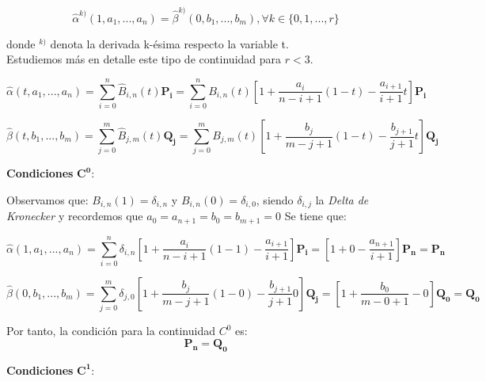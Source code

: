 \documentclass{article}
\begin{document}
\begin{equation}
\hat{\alpha}^{k)}(1,a_1,...,a_n) = \hat{\beta}^{k)}(0,b_1,...,b_m), \forall k \in \{0,1,...,r\}
\end{equation}

donde $^{k)}$ denota la derivada k-ésima respecto la variable t.\\

Estudiemos más en detalle este tipo de continuidad para $r<3$.

\begin{equation*}
\hat{\alpha}(t,a_1,...,a_n) = \sum_{i=0}^{n}\hat{B}_{i,n}(t)\mathbf{P_i} = \sum_{i=0}^n B_{i,n}(t)\left[ 1 + \frac{a_i}{n-i+1}(1-t) - \frac{a_{i+1}}{i+1}t \right] \mathbf{P_i}
\end{equation*}


\begin{equation*}
\hat{\beta}(t,b_1,...,b_m) = \sum_{j=0}^{m}\hat{B}_{j,m}(t)\mathbf{Q_j} = \sum_{j=0}^m B_{j,m}(t)\left[ 1 + \frac{b_j}{m-j+1}(1-t) - \frac{b_{j+1}}{j+1}t \right] \mathbf{Q_j}
\end{equation*}



\textbf{Condiciones} $\mathbf{C^0}$:

Observamos que: $B_{i,n}(1) = \delta_{i,n}$ y $B_{i,n}(0) = \delta_{i,0}$, siendo $\delta_{i,j}$ la \textit{Delta de Kronecker} y recordemos que $a_0=a_{n+1}=b_0=b_{m+1}=0$ Se tiene que:

\begin{equation*}
\hat{\alpha}(1,a_1,...,a_n) = \sum_{i=0}^n \delta_{i,n} \left[ 1 + \frac{a_i}{n-i+1}(1-1) - \frac{a_{i+1}}{i+1}  \right] \mathbf{P_i} = \left[ 1 + 0 - \frac{a_{n+1}}{i+1} \right] \mathbf{P_n} = \mathbf{P_n}
\end{equation*}

\begin{equation*}
\hat{\beta}(0,b_1,...,b_m) = \sum_{j=0}^m \delta_{j,0} \left[ 1 + \frac{b_j}{m-j+1}(1-0) - \frac{b_{j+1}}{j+1}0 \right] \mathbf{Q_j} = \left[ 1 + \frac{b_0}{m-0+1} - 0 \right] \mathbf{Q_0} = \mathbf{Q_0}
\end{equation*}

Por tanto, la condición para la continuidad $C^0	$ es:
\begin{equation}
\mathbf{P_n} = \mathbf{Q_0} 
\end{equation}



\textbf{Condiciones} $\mathbf{C^1}$:
\end{document}
